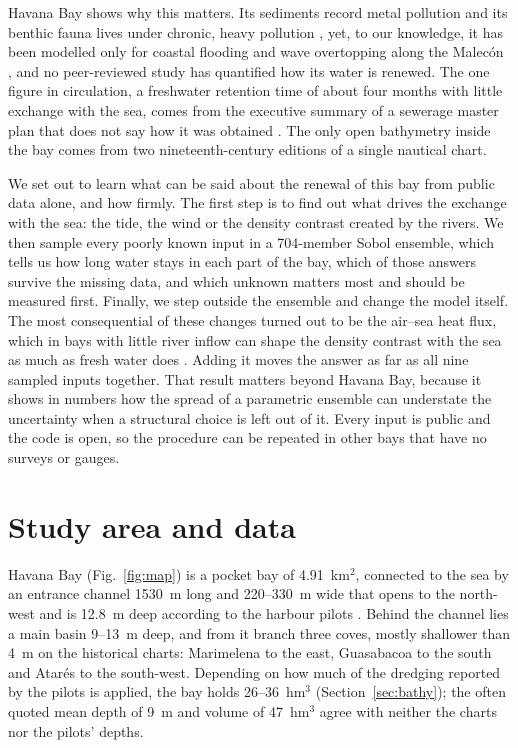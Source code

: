 \documentclass[a4paper,fleqn]{ems-dc}
\begin{document}
Havana Bay shows why this matters. Its sediments record metal pollution
\citep{DiazAsencio2011} and its benthic fauna lives under chronic, heavy pollution
\citep{Armenteros2009}, yet, to our knowledge, it has been modelled only for coastal flooding
and wave overtopping along the Malec\'on \citep{PoncePortela2012,CordovaDeHorta2025}, and no
peer-reviewed study has quantified how its water is renewed. The one figure in circulation,
a freshwater retention time of about four months with little exchange with the sea, comes
from the executive summary of a sewerage master plan that does not say how it was obtained
\citep{JICA2004}. The only open bathymetry inside the bay comes from two nineteenth-century
editions of a single nautical chart.

We set out to learn what can be said about the renewal of this bay from public data alone,
and how firmly. The first step is to find out what drives the exchange with the sea: the
tide, the wind or the density contrast created by the rivers. We then sample every poorly
known input in a 704-member Sobol ensemble, which tells us how long water stays in each part
of the bay, which of those answers survive the missing data, and which unknown matters most
and should be measured first. Finally, we step outside the ensemble and change the model
itself. The most consequential of these changes turned out to be the air--sea heat flux,
which in bays with little river inflow can shape the density contrast with the sea as much
as fresh water does \citep{Largier2010}. Adding it moves the answer as far as all nine
sampled inputs together. That result matters beyond Havana Bay, because it shows in numbers
how the spread of a parametric ensemble can understate the uncertainty when a structural
choice is left out of it. Every input is public and the code is open, so the procedure can
be repeated in other bays that have no surveys or gauges.

\section{Study area and data}\label{sec:area}
Havana Bay (Fig.~\ref{fig:map}) is a pocket bay of 4.91~km$^2$, connected to the sea by an
entrance channel 1530~m long and 220--330~m wide that opens to the north-west and is 12.8~m
deep according to the harbour pilots \citep{Practicos2018}. Behind the channel lies a main
basin 9--13~m deep, and from it branch three coves, mostly shallower than 4~m on the
historical charts: Marimelena to the east, Guasabacoa to the south and Atar\'es to the
south-west. Depending on how much of the dredging reported by the pilots is applied, the bay
holds 26--36~hm$^3$ (Section~\ref{sec:bathy}); the often quoted mean depth of 9~m and volume
of 47~hm$^3$ \citep{JICA2004} agree with neither the charts nor the pilots' depths.
\end{document}
